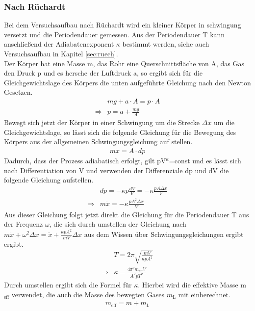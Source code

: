 \documentclass[12pt,a4paper,titlepage,headinclude,bibtotoc]{scrartcl}
\begin{document}
\subsubsection{Nach Rüchardt}
Bei dem Versuchsaufbau nach Rüchardt wird ein kleiner Körper in schwingung versetzt und die Periodendauer gemessen.
Aus der Periodendauer T kann anschließend der Adiabatenexponent $\kappa$ bestimmt werden, siehe auch Versuchsaufbau in Kapitel \ref{sec:ruech}.\\
Der Körper hat eine Masse m, das Rohr eine Querschnittsfläche von A, das Gas den Druck p und es hersche der Luftdruck a, so ergibt sich für die Gleichgewichtslage des Körpers die unten aufgeführte Gleichung nach den Newton Gesetzen.
\begin{align}
	& mg + a\cdot A = p \cdot A\\
	\Rightarrow & p=a+\frac{mg}{A}
\end{align}
Bewegt sich jetzt der Körper in einer Schwingung um die Strecke $\Delta x$ um die Gleichgewichtslage, so lässt sich die folgende Gleichung für die Bewegung des Körpers aus der allgemeinen Schwingungsgleichung auf stellen.
\begin{align}
	m\ddot{x}=A\cdot dp
\end{align}
Dadurch, dass der Prozess adiabatisch erfolgt, gilt pV$^\kappa$=const und es lässt sich nach Differentiation von V und verwenden der Differenziale dp und dV die folgende Gleichung aufstellen.
\begin{align}
	& dp=-\kappa p \frac{dV}{V}=-\kappa \frac{pA\Delta x}{V}\\
	\Rightarrow & m \ddot{x}=-\kappa\frac{pA^2\Delta x}{V}
\end{align}
Aus dieser Gleichung folgt jetzt direkt die Gleichung für die Periodendauer T aus der Frequenz $\omega$, die sich durch umstellen der Gleichung nach $m\ddot{x}+\omega^2 \Delta x=\ddot{x} + \frac{\kappa pA^2}{mV}\Delta x$ aus dem Wissen über Schwingungsgleichungen ergibt ergibt.
\begin{align}
	& T = 2\pi\sqrt{\frac{mV}{\kappa pA^2}}\\
	\Rightarrow & \kappa = \frac{4\pi^2m_\text{eff}V}{A^2pT^2} 
	\label{eq:kappaR}
\end{align}
Durch umstellen ergibt sich die Formel für $\kappa$.
Hierbei wird die effektive Masse m$_\text{eff}$ verwendet, die auch die Masse des bewegten Gases $m_\text{L}$ mit einberechnet.
\begin{align}
	m_\text{eff} = m + m_\text{L}
\end{align}
\end{document}
